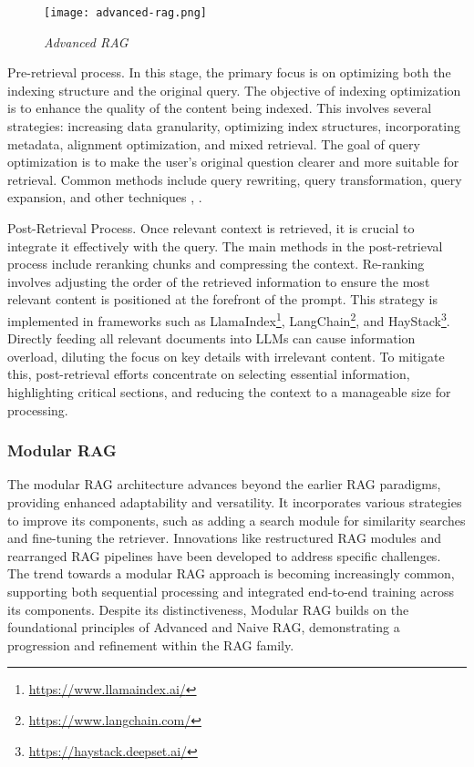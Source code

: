 \begin{figure}[H]
    \centering
    \texttt{[image: advanced-rag.png]}
    \caption{
        \it{Advanced RAG}
    }
    \label{fig:advanced-rag}
\end{figure}

Pre-retrieval process. In this stage, the primary focus is on optimizing both the indexing structure and the original query. The objective of indexing optimization is to enhance the quality of the content being indexed. This involves several strategies: increasing data granularity, optimizing index structures, incorporating metadata, alignment optimization, and mixed retrieval. The goal of query optimization is to make the user's original question clearer and more suitable for retrieval. Common methods include query rewriting, query transformation, query expansion, and other techniques \cite{ma2023query}, \cite{peng2024large} \cite{gao2022precise}.

Post-Retrieval Process. Once relevant context is retrieved, it is crucial to integrate it effectively with the query. The main methods in the post-retrieval process include reranking chunks and compressing the context. Re-ranking involves adjusting the order of the retrieved information to ensure the most relevant content is positioned at the forefront of the prompt. This strategy is implemented in frameworks such as LlamaIndex\footnote{\url{https://www.llamaindex.ai/}}, LangChain\footnote{\url{https://www.langchain.com/}}, and HayStack\footnote{\url{https://haystack.deepset.ai/}}. Directly feeding all relevant documents into LLMs can cause information overload, diluting the focus on key details with irrelevant content. To mitigate this, post-retrieval efforts concentrate on selecting essential information, highlighting critical sections, and reducing the context to a manageable size for processing.

\subsubsection*{Modular RAG}

The modular RAG architecture advances beyond the earlier RAG paradigms, providing enhanced adaptability and versatility. It incorporates various strategies to improve its components, such as adding a search module for similarity searches and fine-tuning the retriever. Innovations like restructured RAG modules \cite{yu2023generate} and rearranged RAG pipelines \cite{shao2023enhancing} have been developed to address specific challenges. The trend towards a modular RAG approach is becoming increasingly common, supporting both sequential processing and integrated end-to-end training across its components. Despite its distinctiveness, Modular RAG builds on the foundational principles of Advanced and Naive RAG, demonstrating a progression and refinement within the RAG family.